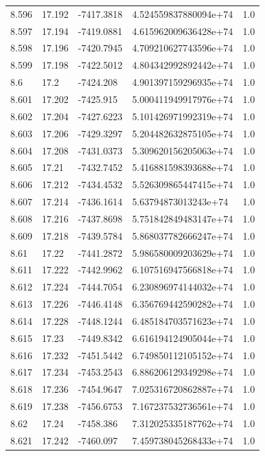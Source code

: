 \begin{tabular}{lllll}
8.596 & 17.192 & -7417.3818 & 4.524559837880094e+74 & 1.0 \\
8.597 & 17.194 & -7419.0881 & 4.615962009636428e+74 & 1.0 \\
8.598 & 17.196 & -7420.7945 & 4.709210627743596e+74 & 1.0 \\
8.599 & 17.198 & -7422.5012 & 4.804342992892442e+74 & 1.0 \\
8.6 & 17.2 & -7424.208 & 4.901397159296935e+74 & 1.0 \\
8.601 & 17.202 & -7425.915 & 5.000411949917976e+74 & 1.0 \\
8.602 & 17.204 & -7427.6223 & 5.101426971992319e+74 & 1.0 \\
8.603 & 17.206 & -7429.3297 & 5.204482632875105e+74 & 1.0 \\
8.604 & 17.208 & -7431.0373 & 5.309620156205063e+74 & 1.0 \\
8.605 & 17.21 & -7432.7452 & 5.416881598393688e+74 & 1.0 \\
8.606 & 17.212 & -7434.4532 & 5.526309865447415e+74 & 1.0 \\
8.607 & 17.214 & -7436.1614 & 5.63794873013243e+74 & 1.0 \\
8.608 & 17.216 & -7437.8698 & 5.751842849483147e+74 & 1.0 \\
8.609 & 17.218 & -7439.5784 & 5.868037782666247e+74 & 1.0 \\
8.61 & 17.22 & -7441.2872 & 5.986580009203629e+74 & 1.0 \\
8.611 & 17.222 & -7442.9962 & 6.107516947566818e+74 & 1.0 \\
8.612 & 17.224 & -7444.7054 & 6.230896974144032e+74 & 1.0 \\
8.613 & 17.226 & -7446.4148 & 6.356769442590282e+74 & 1.0 \\
8.614 & 17.228 & -7448.1244 & 6.485184703571623e+74 & 1.0 \\
8.615 & 17.23 & -7449.8342 & 6.616194124905044e+74 & 1.0 \\
8.616 & 17.232 & -7451.5442 & 6.749850112105152e+74 & 1.0 \\
8.617 & 17.234 & -7453.2543 & 6.886206129349298e+74 & 1.0 \\
8.618 & 17.236 & -7454.9647 & 7.025316720862887e+74 & 1.0 \\
8.619 & 17.238 & -7456.6753 & 7.167237532736561e+74 & 1.0 \\
8.62 & 17.24 & -7458.386 & 7.312025335187762e+74 & 1.0 \\
8.621 & 17.242 & -7460.097 & 7.459738045268433e+74 & 1.0 \\

\end{tabular}
